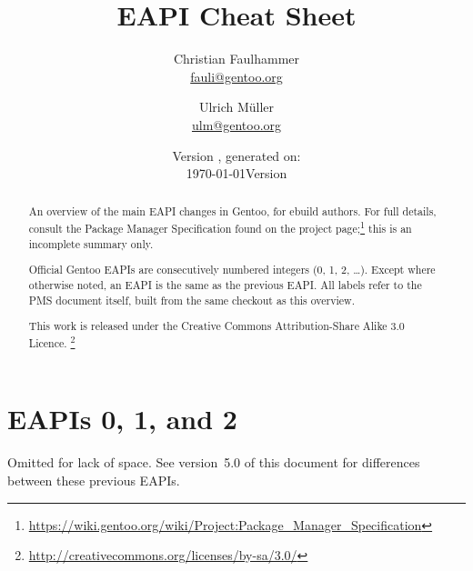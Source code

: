 \documentclass[a4paper,nofoldmark]{leaflet}
\title{EAPI Cheat Sheet}
\author{%
    Christian Faulhammer \\
    \href{mailto:fauli@gentoo.org}{fauli@gentoo.org}
    \and
    Ulrich Müller \\
    \href{mailto:ulm@gentoo.org}{ulm@gentoo.org}
}
\date{Version \version{}, generated on: \\\today}
\date{Version \version\\\printdate{\VCDateISO}}
\newcommand{\code}[1]{\texttt{#1}}
\newcommand{\featureref}[1]{\textsc{#1} on page~\pageref{feat:#1}}
\begin{document}
\maketitle
\thispagestyle{empty}
\begin{abstract}
    An overview of the main EAPI changes in Gentoo, for ebuild
    authors.  For full details, consult the Package Manager
    Specification found on the project page;\footnote{%
    \url{https://wiki.gentoo.org/wiki/Project:Package_Manager_Specification}}
    this is an incomplete summary only.

    Official Gentoo EAPIs are consecutively numbered integers (0, 1,
    2, \dots).  Except where otherwise noted, an EAPI is the same as
    the previous EAPI\@.  All labels refer to the PMS document itself,
    built from the same checkout as this overview.


    This work is released under the Creative Commons
    Attribution-Share Alike 3.0 Licence.%
    \footnote{\url{http://creativecommons.org/licenses/by-sa/3.0/}}
\end{abstract}

\section{EAPIs 0, 1, and 2}
\label{sec:cs:eapi0-2}
Omitted for lack of space. See version~5.0 of this document for
differences between these previous EAPIs.


\end{document}
